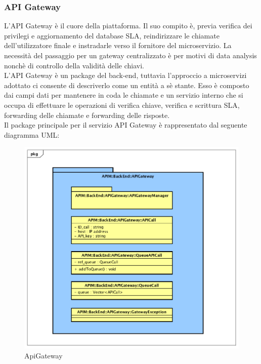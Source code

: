 \subsubsection{API Gateway}

L'API Gateway è il cuore della piattaforma. Il suo compito è, previa verifica dei privilegi e aggiornamento del database SLA, reindirizzare le chiamate dell'utilizzatore finale e instradarle verso il fornitore del microservizio.  La necessità del passaggio per un gateway centralizzato è per motivi di data analysis nonchè di controllo della validità delle chiavi. \\

L'API Gateway è un package del back-end, tuttavia l'approccio a microservizi adottato ci consente di descriverlo come un entità a sè stante. Esso è composto dai campi dati per mantenere in coda le chiamate e un servizio interno che si occupa di effettuare le operazioni di verifica chiave, verifica e scrittura SLA, forwarding delle chiamate e forwarding delle risposte.  \\

Il package principale per il servizio API Gateway è rappresentato dal seguente diagramma UML:

\begin{figure}[!htbp]
	\centering
	\includegraphics[scale=0.45]{UML/DiagrammiPackage/ApiGateway.png}
	\caption{ApiGateway}
\end{figure}

